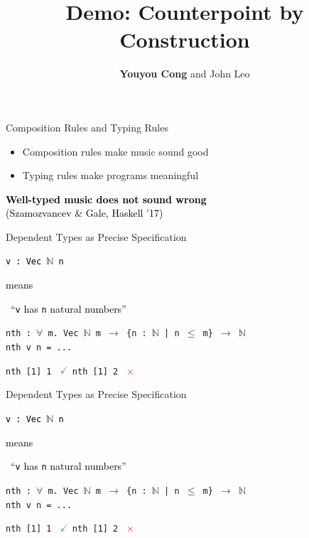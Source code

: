 \documentclass[14pt]{beamer}
\title{Demo: Counterpoint by Construction}
\author{\textbf{Youyou Cong} and John Leo}
\date{}
\newcommand{\blue}[1]{\textcolor{bcolor}{#1}}
\newcommand{\black}[1]{\textcolor{black}{#1}}
\newcommand{\ok}{\textcolor{okcolor}{\checkmark}}
\newcommand{\bad}{\textcolor{red}{\times}}
\newcommand{\bscreen}[1]{\blue{
\begin{screen}
\begin{center}
\black{#1}
\end{center}
\end{screen}
}}
\begin{document}
\begin{frame}
  \titlepage
\end{frame}

\begin{frame}{Composition Rules and Typing Rules}
\begin{itemize}
\setlength{\itemsep}{15pt}
\item Composition rules make music sound good 
\item Typing rules make programs meaningful
\end{itemize}

\bscreen{
\textbf{Well-typed music does not sound wrong} \\
(Szamozvancev \& Gale, Haskell '17)
}
\end{frame}

\begin{frame}{Dependent Types as Precise Specification}
\vspace{-6mm}
\bscreen{
\!\texttt{v :\ Vec $\mathbb{N}$ \blue{n}} \ 
\begin{small}means\end{small} \ 
``\texttt{v} has \texttt{\blue{n}} natural numbers''\!}

\vspace{4mm}

\begin{small}
\texttt{nth :\ $\forall$ m.\ Vec $\mathbb{N}$ m $\rightarrow$ \{n :\ $\mathbb{N}$ | n $\leq$ m\} $\rightarrow$ $\mathbb{N}$ \\
nth v n = ...}

\vspace{3mm}

\texttt{nth [1] 1} \ $\ok$ \hspace{2.2cm} \texttt{nth [1] 2} \ $\bad$
\end{small}
\end{frame}

\begin{frame}{Dependent Types as Precise Specification}
\vspace{-6mm}
\bscreen{
\!\texttt{v :\ Vec $\mathbb{N}$ \blue{n}} \ 
\begin{small}means\end{small} \ 
``\texttt{v} has \texttt{\blue{n}} natural numbers''\!}

\vspace{4mm}

\begin{small}
\texttt{nth :\ $\forall$ m.\ Vec $\mathbb{N}$ m $\rightarrow$ \{n :\ $\mathbb{N}$ | \blue{n $\leq$ m}\} $\rightarrow$ $\mathbb{N}$ \\
nth v n = ...}

\vspace{3mm}

\texttt{nth [1] 1} \ $\ok$ \hspace{2.2cm} \texttt{nth [1] 2} \ $\bad$
\end{small}
\end{frame}
\end{document}
